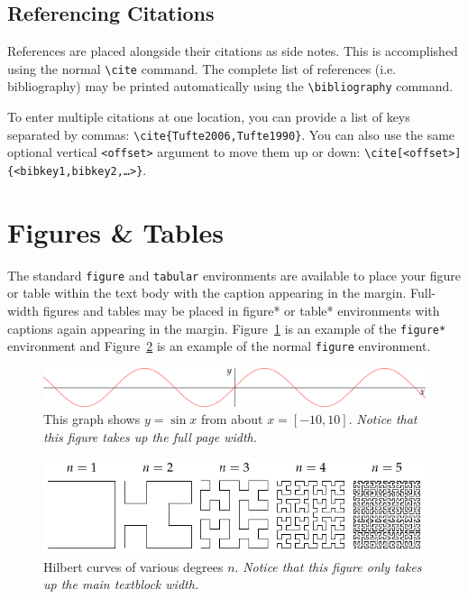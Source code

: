 \documentclass[a4paper]{tufte-handout} %
\begin{document}
\subsection{Referencing Citations}

References are placed alongside their citations as side notes\cite{Tufte1997}. This is accomplished using the normal \texttt{\textbackslash cite} command. The complete list of references (i.e. bibliography) may be printed automatically using the \texttt{\textbackslash bibliography} command.

To enter multiple citations at one location\cite{Tufte2006,Tufte1990}, you can provide a list of keys separated by commas: \texttt{\textbackslash cite\{Tufte2006,Tufte1990\}}. You can also use the same optional vertical \texttt{<offset>} argument to move them up or down: \texttt{\textbackslash cite[<offset>]\{<bibkey1,bibkey2,\ldots>\}}.


\section{Figures \& Tables}\label{sec:figuresandtables}

The standard \texttt{figure} and \texttt{tabular} environments are available to place your figure or table within the text body with the caption appearing in the margin. Full-width figures and tables may be placed in \textsf{figure*} or \textsf{table*} environments with captions again appearing in the margin. Figure~\ref{fig:fullfig} is an example of the \texttt{figure*} environment and Figure~\ref{fig:textfig} is an example of the normal \texttt{figure} environment.

\begin{figure}[h]
	\includegraphics[width=\linewidth]{sine.pdf}%
	\caption{This graph shows $y = \sin x$ from about $x = [-10, 10]$.
	\emph{Notice that this figure takes up the full page width.}}%
	\label{fig:fullfig}%
\end{figure}

\begin{figure}[h]
	\includegraphics{hilbertcurves.pdf}
	\caption{Hilbert curves of various degrees $n$.
	\emph{Notice that this figure only takes up the main textblock width.}}
	\label{fig:textfig}
\end{figure}
\end{document}
